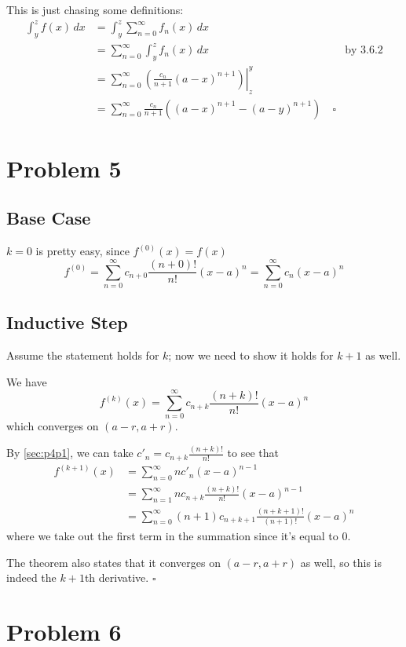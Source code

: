 \documentclass[12pt]{article}
\begin{document}
This is just chasing some definitions:
\begin{align*}
    \int_y^z f(x)\,dx
    &= \int_y^z \sum_{n=0}^\infty f_n(x)\,dx \\
    &= \sum_{n=0}^\infty \int_y^z f_n(x)\,dx & \text{by 3.6.2} \\
    &= \sum_{n=0}^\infty \left.\left(\frac{c_n}{n+1}(a-x)^{n+1}\right)\right|^y_z \\
    &= \sum_{n=0}^\infty \frac{c_n}{n+1}\left((a-x)^{n+1}-(a-y)^{n+1}\right)\quad\square
\end{align*}

\pagebreak

\section{Problem 5}\label{sec:p5}

\subsection{Base Case}

$k=0$ is pretty easy, since $f^{(0)}(x)=f(x)$
\[f^{(0)}=\sum_{n=0}^\infty c_{n+0}\frac{(n+0)!}{n!}(x-a)^n=\sum_{n=0}^\infty c_n(x-a)^n\]

\subsection{Inductive Step}

Assume the statement holds for $k$; now we need to show it holds for $k+1$ as well.

We have
\[f^{(k)}(x)=\sum_{n=0}^\infty c_{n+k}\frac{(n+k)!}{n!}(x-a)^n\]
which converges on $(a-r, a+r)$.

By \ref{sec:p4p1}, we can take $c'_n=c_{n+k}\frac{(n+k)!}{n!}$ to see that
\begin{align*}
    f^{(k+1)}(x)
    &=\sum_{n=0}^\infty nc'_n(x-a)^{n-1} \\
    &=\sum_{n=1}^\infty nc_{n+k}\frac{(n+k)!}{n!}(x-a)^{n-1} \\
    &=\sum_{n=0}^\infty (n+1)c_{n+k+1}\frac{(n+k+1)!}{(n+1)!}(x-a)^n
\end{align*}
where we take out the first term in the summation since it's equal to $0$.

The theorem also states that it converges on $(a-r, a+r)$ as well,
so this is indeed the $k+1$th derivative. $\square$

\pagebreak

\section{Problem 6}
\end{document}
